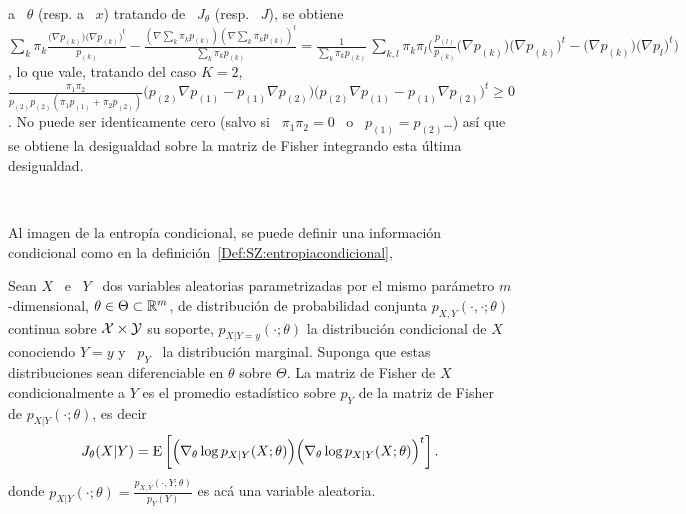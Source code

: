 \begin{itemize}
  a  \ $\theta$  (resp. a  \ $x$)  tratando de  \ $J_\theta$  (resp. \  $J$), se
  obtiene  \  $\sum_k  \pi_k  \frac{\big(  \nabla  p_{(k)}  \big)  \big(  \nabla
  p_{(k)}    \big)^t}{p_{(k)}}    -    \frac{\left(    \nabla    \sum_k    \pi_k
  p_{(k)}  \right) \left(  \nabla \sum_k  \pi_k p_{(k)}  \right)^t}{\sum_k \pi_k
  p_{(k)}}                =                 \frac{1}{\sum_k                \pi_k
  p_{(k)}} \, \sum_{k,l} \pi_k  \pi_l \Big( \frac{p_{(l)}}{p_{(k)}} \big( \nabla
  p_{(k)}    \big)   \big(    \nabla    p_{(k)}   \big)^t    -   \big(    \nabla
  p_{(k)} \big) \big( \nabla p_l \big)^t  \Big)$, lo que vale, tratando del caso
  $K  = 2$,  \  $  \frac{\pi_1 \pi_2}{p_{(2)}  p_{(2)}  (\pi_1  p_{(1)} +  \pi_2
  p_{(2)})} \big(  p_{(2)} \nabla p_{(1)}  - p_{(1)} \nabla p_{(2)}  \big) \big(
  p_{(2)} \nabla p_{(1)} - p_{(1)} \nabla  p_{(2)} \big)^t \ge 0$.  No puede ser
  identicamente  cero  (salvo  si  \  $\pi_1  \pi_2  =  0$  \  o  \  $p_{(1)}  =
  p_{(2)}$\ldots) as\'i que se obtiene la  desigualdad sobre la matriz de Fisher
  integrando esta \'ultima desigualdad.
\end{itemize}

\

Al  imagen de  la entrop\'ia  condicional,  se puede  definir una  informaci\'on
condicional como en la definici\'on~\ref{Def:SZ:entropiacondicional},
%
\begin{definicion}
\label{Def:SZ:MatrizFisherParametricaCondicional}
%
Sean  $X$ \  e \  $Y$ \  dos variables  aleatorias parametrizadas  por  el mismo
par\'ametro   $m$-dimensional,  $\theta  \in   \Theta  \subset   \mathbb{R}^m$,  de
distribuci\'on  de probabilidad conjunta  $p_{X,Y}(\cdot,\cdot;\theta)$ continua
sobre  $\mathcal{X} \times  \mathcal{Y}$ su  soporte, $p_{X|Y=y}(\cdot;\theta)$  la distribuci\'on
condicional  de $X$ conociendo  $Y=y$ y  \ $p_Y$  \ la  distribuci\'on marginal.
Suponga que estas distribuciones  sean diferenciable en $\theta$ sobre $\Theta$.
La matriz de  Fisher de $X$ condicionalmente a $Y$  es el promedio estad\'istico
sobre $p_Y$ de la matriz de Fisher de $p_{X|Y}(\cdot;\theta)$, es decir
  \[
  J_\theta(X|Y)  = \operatorname{E}\left[ \Big(  \nabla_\theta \log  p_{X|Y}(X;\theta) \Big)
    \Big( \nabla_\theta \log p_{X|Y}(X;\theta) \Big)^t \right].
  \]
  donde  $p_{X|Y}(\cdot;\theta)   =  \frac{p_{X,Y}(\cdot,Y;\theta)}{p_Y(Y)}$  es
  ac\'a una variable aleatoria.
\end{definicion}

